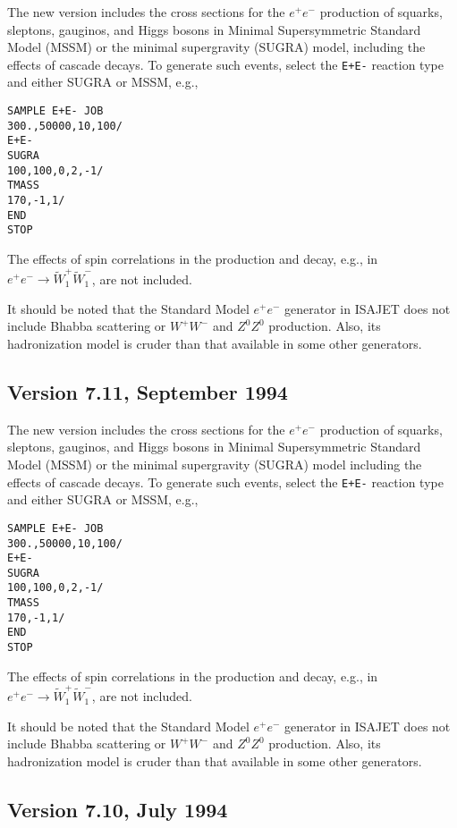       The new version includes the cross sections for the $e^+e^-$
production of squarks, sleptons, gauginos, and Higgs bosons in Minimal
Supersymmetric Standard Model (MSSM) or the minimal supergravity
(SUGRA) model, including the effects of cascade decays. To generate
such events, select the \verb|E+E-| reaction type and either SUGRA or
MSSM, e.g.,
\begin{verbatim}
SAMPLE E+E- JOB
300.,50000,10,100/
E+E-
SUGRA
100,100,0,2,-1/
TMASS
170,-1,1/
END
STOP
\end{verbatim}
The effects of spin correlations in the production and decay, e.g., in
$e^+e^- \to \widetilde W_1^+ \widetilde W_1^-$, are not included. 

      It should be noted that the Standard Model $e^+e^-$ generator in
ISAJET does not include Bhabba scattering or $W^+W^-$ and $Z^0Z^0$
production. Also, its hadronization model is cruder than that
available in some other generators.

\subsection{Version 7.11, September 1994}

      The new version includes the cross sections for the $e^+e^-$
production of squarks, sleptons, gauginos, and Higgs bosons in Minimal
Supersymmetric Standard Model (MSSM) or the minimal supergravity
(SUGRA) model including the effects of cascade decays. To generate
such events, select the \verb|E+E-| reaction type and either SUGRA or
MSSM, e.g.,
\begin{verbatim}
SAMPLE E+E- JOB
300.,50000,10,100/
E+E-
SUGRA
100,100,0,2,-1/
TMASS
170,-1,1/
END
STOP
\end{verbatim}
The effects of spin correlations in the production and decay, e.g., in
$e^+e^- \to \widetilde W_1^+ \widetilde W_1^-$, are not included. 

      It should be noted that the Standard Model $e^+e^-$ generator in
ISAJET does not include Bhabba scattering or $W^+W^-$ and $Z^0Z^0$
production. Also, its hadronization model is cruder than that
available in some other generators.

\subsection{Version 7.10, July 1994}

